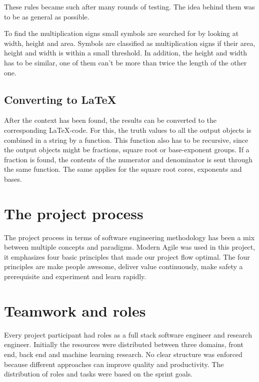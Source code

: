 These rules became such after many rounds of testing. The idea behind them was to be as general as possible.

To find the multiplication signs small symbols are searched for by looking at width, height and area. Symbols are classified as multiplication signs if their area, height and width is within a small threshold. In addition, the height and width has to be similar, one of them can't be more than twice the length of the other one.


\subsection{Converting to \LaTeX}
After the context has been found, the results can be converted to the corresponding \LaTeX -code. For this, the truth values to all the output objects is combined in a string by a function. This function also has to be recursive, since the output objects might be fractions, square root or base-exponent groups. If a fraction is found, the contents of the numerator and denominator is sent through the same function. The same applies for the square root cores, exponents and bases.

\section{The project process} %
The project process in terms of software engineering methodology has been a mix between multiple concepts and paradigms. Modern Agile was used in this project, it emphasizes four basic principles that made our project flow optimal. The four principles are make people awesome, deliver value continuously, make safety a prerequisite and experiment and learn rapidly. \cite{agile_modern_????}


\section{Teamwork and roles} %
Every project participant had roles as a full stack software engineer and research engineer. Initially the resources were distributed between three domains, front end, back end and machine learning research. No clear structure was enforced because different approaches can improve quality and productivity. The distribution of roles and tasks were based on the sprint goals.
